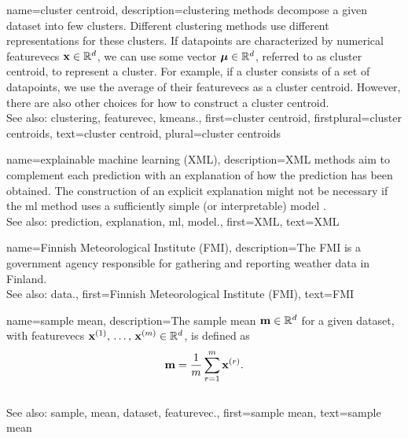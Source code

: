 {name={cluster centroid}, 
	description={\Gls{clustering} methods decompose a given 
		\gls{dataset} into few \glspl{cluster}. Different \gls{clustering} methods use 
		different representations for these \glspl{cluster}. If \glspl{datapoint} are 
		characterized by numerical \glspl{featurevec} ${\bf x} \in \mathbb{R}^{d}$, 
		we can use some vector ${\bm \mu} \in \mathbb{R}^{d}$, referred to 
		as \gls{cluster} centroid, to represent a \gls{cluster}. For example, if a \gls{cluster} 
		consists of a set of \glspl{datapoint}, we use the average of their \glspl{featurevec} 
		as a \gls{cluster} centroid. However, there are also other choices for how to construct a \gls{cluster} centroid. 
		\\
		See also: \gls{clustering}, \gls{featurevec}, \gls{kmeans}.},
	first={cluster centroid},
	firstplural={cluster centroids}, 
	text={cluster centroid}, 
	plural={cluster centroids}
}


{name={explainable machine learning (XML)}, 
	description={XML 
		methods aim to complement each \gls{prediction} with an \gls{explanation} of 
		how the \gls{prediction} has been obtained. The construction of an explicit \gls{explanation} 
		might not be necessary if the \gls{ml} method uses a sufficiently simple (or interpretable) \gls{model} \cite{rudin2019stop}.
				\\
		See also: \gls{prediction}, \gls{explanation}, \gls{ml}, \gls{model}.},
	first={XML},
	text={XML} 
}

{name={Finnish Meteorological Institute (FMI)}, 
	description={The
		FMI is a government agency responsible for gathering 
		and reporting weather \gls{data} in Finland.
				\\
		See also: \gls{data}.},
	first={Finnish Meteorological Institute (FMI)},
	text={FMI} 
}
	
	
{name={sample mean}, 
	description={The \gls{sample} \gls{mean} 
		${\bf m} \in \mathbb{R}^{d}$ for a given \gls{dataset}, with \glspl{featurevec} 
		${\bf x}^{(1)}, \,\ldots, \,{\bf x}^{(m)} \in \mathbb{R}^{d}$, is defined as 
		$${\bf m} = \frac{1}{m} \sum_{r=1}^{m} {\bf x}^{(r)}.$$ 
					\\
		See also: \gls{sample}, \gls{mean}, \gls{dataset}, \gls{featurevec}.},
	first={sample mean},
	text={sample mean} 
}

